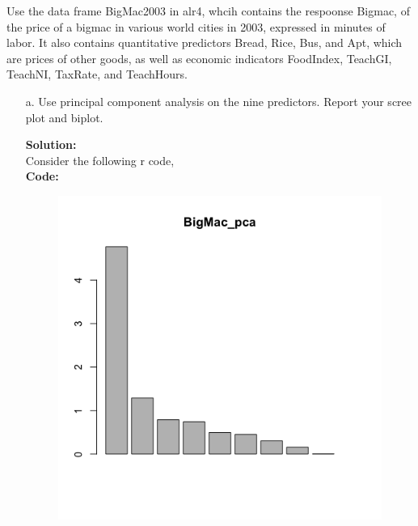 \documentclass[12pt]{article}
\makeatletter
\theoremstyle{homework}
\newenvironment{exercise}[1]
{\def\@currentlabel{#1}\exercisecore}
{\endexercisecore}
\newcommand{\localhead}[1]{\par\smallskip\noindent\textbf{#1}\nobreak\\}%
\newcommand\solution{\localhead{Solution:}}
\makeatother
\begin{document}
\begin{exercise}{3} Use the data frame BigMac2003 in alr4, whcih contains the respoonse Bigmac, of the price of a
  bigmac in various world cities in 2003, expressed in minutes of labor. It also contains quantitative predictors Bread, 
  Rice, Bus, and Apt, which are prices of other goods, as well as economic indicators FoodIndex, TeachGI, TeachNI, TaxRate, 
  and TeachHours.\\
  \begin{enumerate}
    \item[a.] Use principal component analysis on the nine predictors. Report your scree plot and biplot.\\
    \solution Consider the following r code, \\
    \textbf{Code:}
    \begin{center}
    
    \end{center} 
    \begin{figure}[H]
      \begin{center}
      \includegraphics[width = .66\textwidth]{Rplot02.png}
      \end{center}
    \end{figure}
    \begin{figure}[H]
      \begin{center}

\end{center}
\end{figure}
\end{enumerate}
\end{exercise}
\end{document}
